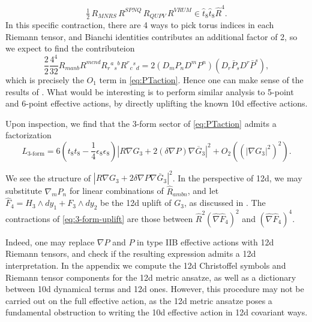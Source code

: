 \begin{equation}
\tfrac{1}{2}\,R_{MNRS}\,R^{SPNQ}\,R_{QUPV}\,R^{VRUM} \in \hat{t}_8\hat{t}_8 \hat{R}^4.
\end{equation}
In this specific contraction, there are 4 ways to pick torus indices in each Riemann tensor, and Bianchi identities contributes an additional factor of 2, so we expect to find the contributeion
\begin{equation}
\frac{2}{2}\frac{4^4}{32}R_{m a n b} R^{m c n d} R_r{}^{a}{}_{s}{}^{b} R^{r}{}_{c}{}^{s}{}_{d}
= 2 (D_m P_n D^m P^n)(D_r \bar{P}_s D^r \bar{P}^s),
\end{equation}
which is precisely the $O_1$ term in \eqref{eq:PTaction}.
Hence one can make sense of the results of \cite{Minasian:2015bxa}. What would be interesting is to perform similar analysis to 5-point and 6-point effective actions, by directly uplifting the known 10d effective actions.

Upon inspection, we find that the 3-form sector of \eqref{eq:PTaction} admits a factorization
\begin{equation}
L_{\text{3-form}} = 
6(t_8t_8 - \frac{1}{4}\epsilon_8\epsilon_8)
|R \nabla G_3 + 2 (\delta \nabla P) \nabla \overline{G}_3|^2
+ O_2((|\nabla G_3|^2)^2).
\label{eq:3-form-uplift}
\end{equation}

We see the structure of $|R \nabla G_3 + 2 \delta \nabla P \nabla \bar{G}_3|^2$.
In the perspective of 12d, we may substitute $\nabla_m P_n$ for linear combinations of $\hat{R}_{ambn}$, and let $\hat{F}_4 = H_3 \wedge dy_1 + F_3 \wedge dy_2$ be the 12d uplift of $G_3$, as discussed in \cite{Cheng:2025efp}.
The contractions of \eqref{eq:3-form-uplift} are those between $\hat{R}^2 (\hat{\nabla} \hat{F}_4)^2$ and $(\hat{\nabla} \hat{F}_4)^4$.

Indeed, one may replace $\nabla P$ and $P$ in type IIB effective actions with 12d Riemann tensors, and check if the resulting expression admits a 12d interpretation.
In the appendix we compute the 12d Christoffel symbols and Riemann tensor components for the 12d metric ansatze, as well as a dictionary between 10d dynamical terms and 12d ones.
However, this procedure may not be carried out on the full effective action, as the 12d metric ansatze poses a fundamental obstruction to writing the 10d effective action in 12d covariant ways.

